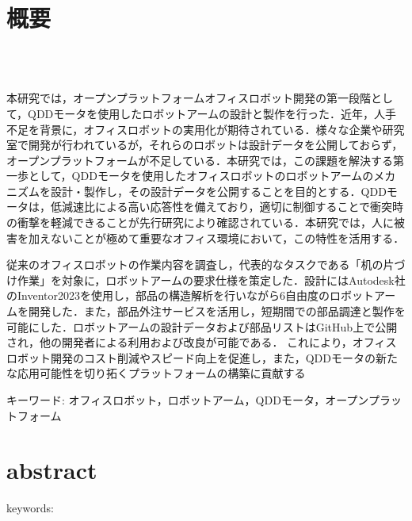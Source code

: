\chapter*{概要}
\thispagestyle{empty}
%
\begin{center}
  \scalebox{1.5}{オープンプラットフォームオフィスロボットの開発}\\
  \scalebox{1.2}{-QDDモータを使用したロボットアームの設計と製作-}\\
\end{center}
\vspace{1.0zh}
%

本研究では，オープンプラットフォームオフィスロボット開発の第一段階として，QDDモータを使用したロボットアームの設計と製作を行った．近年，人手不足を背景に，オフィスロボットの実用化が期待されている．様々な企業や研究室で開発が行われているが，それらのロボットは設計データを公開しておらず，オープンプラットフォームが不足している．本研究では，この課題を解決する第一歩として，QDDモータを使用したオフィスロボットのロボットアームのメカニズムを設計・製作し，その設計データを公開することを目的とする．QDDモータは，低減速比による高い応答性を備えており，適切に制御することで衝突時の衝撃を軽減できることが先行研究により確認されている．本研究では，人に被害を加えないことが極めて重要なオフィス環境において，この特性を活用する．

従来のオフィスロボットの作業内容を調査し，代表的なタスクである「机の片づけ作業」を対象に，ロボットアームの要求仕様を策定した．設計にはAutodesk社のInventor2023を使用し，部品の構造解析を行いながら6自由度のロボットアームを開発した．また，部品外注サービスを活用し，短期間での部品調達と製作を可能にした．ロボットアームの設計データおよび部品リストはGitHub上で公開され，他の開発者による利用および改良が可能である．
これにより，オフィスロボット開発のコスト削減やスピード向上を促進し，また，QDDモータの新たな応用可能性を切り拓くプラットフォームの構築に貢献する


キーワード: オフィスロボット，ロボットアーム，QDDモータ，オープンプラットフォーム
%
\newpage
\chapter*{abstract}
\thispagestyle{empty}
%
\begin{center}
  \scalebox{1.3}{title}
\end{center}
\vspace{1.0zh}
%


keywords: 
